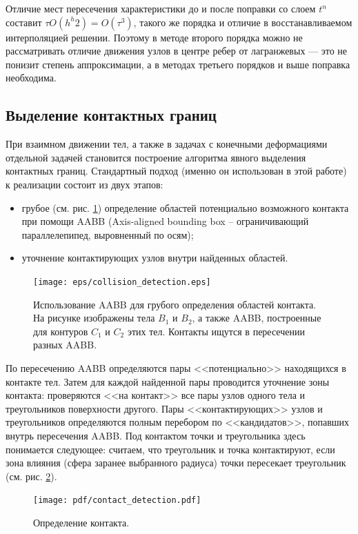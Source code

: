 Отличие мест пересечения характеристики до и после поправки со слоем $t^n$ составит $\tau O(h^h2) = O(\tau^3)$, такого же порядка и отличие в восстанавливаемом интерполяцией решении. Поэтому в методе второго порядка можно не рассматривать отличие движения узлов в центре ребер от лагранжевых — это не понизит степень аппроксимации, а в методах третьего порядков и выше поправка необходима.

\clearpage
\newpage

\subsection{Выделение контактных границ}

При взаимном движении тел, а также в задачах с конечными деформациями отдельной задачей становится построение алгоритма явного выделения контактных границ. Стандартный подход (именно он использован в этой работе) к реализации состоит из двух этапов:
\begin{itemize}
	\item грубое (см. рис. \ref{pic:collision_detection}) определение областей потенциально возможного контакта при помощи AABB (Axis-aligned bounding box -- ограничивающий параллелепипед, выровненный по осям);
	\item уточнение контактирующих узлов внутри найденных областей.
\end{itemize}
\begin{figure}[htp]
\centering
\texttt{[image: eps/collision\_detection.eps]}
\caption{Использование AABB для грубого определения областей контакта. На
рисунке изображены тела $B_1$ и $B_2$, а также AABB, построенные для контуров
$C_1$ и $C_2$ этих тел. Контакты ищутся в пересечении разных AABB.}
\label{pic:collision_detection}
\end{figure}
По пересечению AABB определяются пары <<потенциально>> находящихся в контакте тел. Затем для каждой найденной пары проводится уточнение зоны контакта: проверяются <<на контакт>> все пары узлов одного тела и треугольников поверхности другого. Пары <<контактирующих>> узлов и треугольников определяются полным перебором по <<кандидатов>>, попавших внутрь пересечения AABB. Под контактом точки и треугольника здесь понимается следующее: считаем, что треугольник и точка контактируют, если зона влияния (сфера заранее выбранного радиуса) точки пересекает треугольник (см. рис. \ref{pic:contact_detection}).
\begin{figure}[htp]
\centering
\texttt{[image: pdf/contact\_detection.pdf]}
\caption{Определение контакта.}
\label{pic:contact_detection}
\end{figure}
